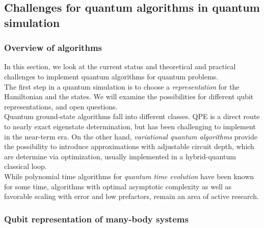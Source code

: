 \documentclass{book}
\theoremstyle{definition}
\begin{document}












\newpage


\subsection{Challenges for quantum algorithms in quantum simulation}

\subsubsection{Overview of algorithms}

In this section, we look at the current status and theoretical and practical challenges to implement quantum algorithms for quantum problems. \\


The first step in a quantum simulation is to choose a \textit{representation} for the Hamiltonian and the states. We will examine the possibilities for different qubit representations, and open questions.\\

Quantum ground-state algorithms fall into different classes. QPE is a direct route to nearly exact eigenstate determination, but has been challenging to implement in the near-term era. On the other hand, \textit{variational quantum algorithms} provide the possibility to introduce approximations with adjustable circuit depth, which are determine via optimization, usually implemented in a hybrid-quantum classical loop. \\

While polynomial time algorithms for \textit{quantum time evolution} have been known for some time, algorithms with optimal asymptotic complexity as well as favorable scaling with error and low prefactors, remain an area of active research.




\subsubsection{Qubit representation of many-body systems}
\end{document}
